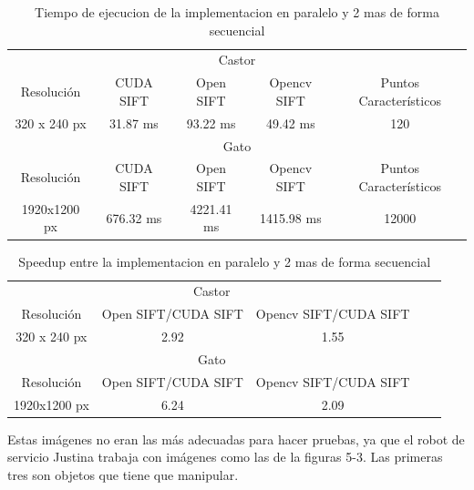 \begin{table}[H]
\centering
\begin{tabular}{|c|c|c|c|c|}
\hline
\multicolumn{5}{|c|}{Castor} \\
\cline{1-5}
Resolución & CUDA SIFT & Open SIFT & Opencv SIFT & Puntos Característicos \\
\hline \hline
320 x 240 px & 31.87 ms   &   93.22 ms  &  49.42 ms   & 120\\ \cline{1-5}
\hline \hline
\multicolumn{5}{|c|}{Gato} \\
\cline{1-5}
Resolución & CUDA SIFT & Open SIFT & Opencv SIFT & Puntos Característicos \\
\hline \hline
1920x1200 px & 676.32 ms &  4221.41 ms & 1415.98 ms   & 12000\\ \cline{1-5}
\end{tabular}
\caption{Tiempo de ejecucion de la implementacion en paralelo y 2 mas de forma secuencial}
\label{tabla:final}
\end{table}
\begin{table}[H]
\centering
\begin{tabular}{|c|c|c|c|c|}
\hline
\multicolumn{3}{|c|}{Castor} \\
\cline{1-3}
Resolución &  Open SIFT/CUDA SIFT & Opencv SIFT/CUDA SIFT  \\
\hline \hline
320 x 240 px & 2.92 & 1.55 \\ \cline{1-3}
\hline \hline
\multicolumn{3}{|c|}{Gato} \\
\cline{1-3}
Resolución & Open SIFT/CUDA SIFT & Opencv SIFT/CUDA SIFT\\
\hline \hline
1920x1200 px  & 6.24 & 2.09 \\ \cline{1-3}
\end{tabular}
\caption{ Speedup entre la implementacion en paralelo y 2 mas de forma secuencial}
\label{tabla:final}
\end{table}
Estas imágenes no eran las más adecuadas para hacer pruebas, ya que el robot de servicio Justina trabaja con imágenes como las de la figuras 5-3. Las primeras tres son objetos que tiene que manipular.\\
